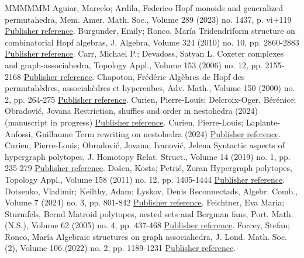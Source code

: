 \begin{thebibliography}{MMMMMM}
 Aguiar, Marcelo; Ardila, Federico Hopf monoids and generalized permutahedra, Mem. Amer. Math. Soc., Volume 289 (2023) no. 1437, p. vi+119 \href{https://alco.centre-mersenne.org/articles/10.5802/alco.401/#AguiarArdila}{Publisher reference}.
 Burgunder, Emily; Ronco, María Tridendriform structure on combinatorial Hopf algebras, J. Algebra, Volume 324 (2010) no. 10, pp. 2860-2883 \href{https://alco.centre-mersenne.org/articles/10.5802/alco.401/#BR}{Publisher reference}.
 Carr, Michael P.; Devadoss, Satyan L. Coxeter complexes and graph-associahedra, Topology Appl., Volume 153 (2006) no. 12, pp. 2155-2168 \href{https://alco.centre-mersenne.org/articles/10.5802/alco.401/#CD-CCGA}{Publisher reference}.
 Chapoton, Frédéric Algèbres de Hopf des permutahèdres, associahèdres et hypercubes, Adv. Math., Volume 150 (2000) no. 2, pp. 264-275 \href{https://alco.centre-mersenne.org/articles/10.5802/alco.401/#Ch00}{Publisher reference}.
 Curien, Pierre-Louis; Delcroix-Oger, Bérénice; Obradović, Jovana Restriction, shuffles and order in nestohedra (2024) (manuscript in progress) \href{https://alco.centre-mersenne.org/articles/10.5802/alco.401/#RSON}{Publisher reference}.
 Curien, Pierre-Louis; Laplante-Anfossi, Guillaume Term rewriting on nestohedra (2024) \href{https://alco.centre-mersenne.org/articles/10.5802/alco.401/#CLA24}{Publisher reference}.
 Curien, Pierre-Louis; Obradović, Jovana; Ivanović, Jelena Syntactic aspects of hypergraph polytopes, J. Homotopy Relat. Struct., Volume 14 (2019) no. 1, pp. 235-279 \href{https://alco.centre-mersenne.org/articles/10.5802/alco.401/#COI}{Publisher reference}.
 Došen, Kosta; Petrić, Zoran Hypergraph polytopes, Topology Appl., Volume 158 (2011) no. 12, pp. 1405-1444 \href{https://alco.centre-mersenne.org/articles/10.5802/alco.401/#DP}{Publisher reference}.
 Dotsenko, Vladimir; Keilthy, Adam; Lyskov, Denis Reconnectads, Algebr. Comb., Volume 7 (2024) no. 3, pp. 801-842 \href{https://alco.centre-mersenne.org/articles/10.5802/alco.401/#DotsenkoReconnectad}{Publisher reference}.
 Feichtner, Eva Maria; Sturmfels, Bernd Matroid polytopes, nested sets and Bergman fans, Port. Math. (N.S.), Volume 62 (2005) no. 4, pp. 437-468 \href{https://alco.centre-mersenne.org/articles/10.5802/alco.401/#FS05}{Publisher reference}.
 Forcey, Stefan; Ronco, María Algebraic structures on graph associahedra, J. Lond. Math. Soc. (2), Volume 106 (2022) no. 2, pp. 1189-1231 \href{https://alco.centre-mersenne.org/articles/10.5802/alco.401/#FR}{Publisher reference}.

\end{thebibliography}
